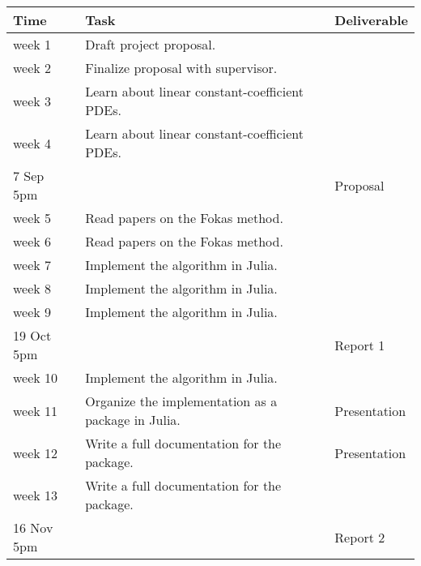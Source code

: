\documentclass[11pt, oneside, a4paper]{article}
\begin{document}
\begin{center}
    \begin{tabular}{|l|l|l|} 
        \hline
        Time & Task & Deliverable\\
        \hline
        week 1 & Draft project proposal. & \\ 
        \hline
        week 2 & Finalize proposal with supervisor.& \\ 
        \hline
        week 3 & Learn about linear constant-coefficient PDEs.&\\
        \hline
        week 4 & Learn about linear constant-coefficient PDEs.&\\
        \hline 
        7 Sep 5pm & & Proposal\\
        \hline
        week 5 & Read papers on the Fokas method.&\\
        \hline
        week 6 & Read papers on the Fokas method.&\\
        \hline
        week 7 & Implement the algorithm in Julia.&\\
        \hline
        week 8 & Implement the algorithm in Julia.&\\
        \hline
        week 9 & Implement the algorithm in Julia.&\\
        \hline
        19 Oct 5pm & & Report 1\\
        \hline
        week 10 & Implement the algorithm in Julia.&\\
        \hline
        week 11 & Organize the implementation as a package in Julia.& Presentation\\
        \hline
        week 12 & Write a full documentation for the package.& Presentation\\
        \hline
        week 13 & Write a full documentation for the package.&\\
        \hline
        16 Nov 5pm & & Report 2\\
        \hline
    \end{tabular}

\end{center}
\end{document}
